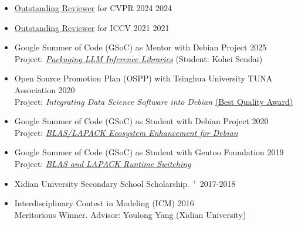 \documentclass[10pt,margin,line,pifont,palatino,courier]{res}
\begin{document}
\begin{resume}
\begin{itemize}[leftmargin=*]
    \item \href{https://cvpr.thecvf.com/Conferences/2024/ProgramCommittee}{\underline{Outstanding Reviewer}} for CVPR 2024 \hfill 2024
    \item \href{http://iccv2021.thecvf.com/outstanding-reviewers}{\underline{Outstanding Reviewer}} for ICCV 2021 \hfill 2021
    \item Google Summer of Code (GSoC) as Mentor with Debian Project \hfill 2025\\
        Project: \href{https://summerofcode.withgoogle.com/programs/2025/projects/Ui7418HU}
        {\textit{Packaging LLM Inference Libraries}} (Student: Kohei Sendai)
    \item Open Source Promotion Plan (OSPP) with Tsinghua University TUNA Association \hfill 2020\\
        {\small Project: \textit{Integrating Data Science Software into Debian} \href{https://isrc.iscas.ac.cn/summer2020/#/announcement}{(Best Quality Award)}}
    \item Google Summer of Code (GSoC) as Student with Debian Project \hfill 2020\\
        {\small Project: \href{https://summerofcode.withgoogle.com/archive/2020/projects/6021080197627904}
        {\textit{BLAS/LAPACK Ecosystem Enhancement for Debian}}}
    \item Google Summer of Code (GSoC) as Student with Gentoo Foundation \hfill 2019\\
        {\small Project: \href{https://summerofcode.withgoogle.com/archive/2019/projects/6513450073718784}
        {\textit{BLAS and LAPACK Runtime Switching}}}
    \item Xidian University Secondary School Scholarship.%
        \href{http://see.xidian.edu.cn/html/news/9732.html}{$^+$} \hfill 2017-2018
    \item Interdisciplinary Contest in Modeling (ICM) \hfill 2016\\
        {\small Meritorious Winner. Advisor: Youlong Yang (Xidian University)}
\end{itemize}



\end{resume}
\end{document}
